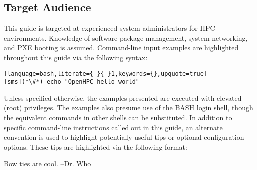 \subsection{Target Audience}

This guide is targeted at experienced \Linux{} system administrators for HPC
environments. Knowledge of software package management, system networking, and
PXE booting is assumed. Command-line input examples are highlighted throughout
this guide via the following syntax:

\begin{lstlisting}[language=bash,literate={-}{-}1,keywords={},upquote=true]
[sms](*\#*) echo "OpenHPC hello world"
\end{lstlisting}

Unless specified otherwise, the examples presented are executed with
elevated (root) privileges. The examples also presume use of the BASH login
shell, though the equivalent commands in other shells can be substituted.
In addition to specific command-line instructions called out in this guide, an
alternate convention is used to highlight potentially useful tips or optional
configuration options. These tips are highlighted via the following format:

\begin{center}
\begin{tcolorbox}[]
\small Bow ties are cool.  --Dr. Who
\end{tcolorbox}
\end{center}

